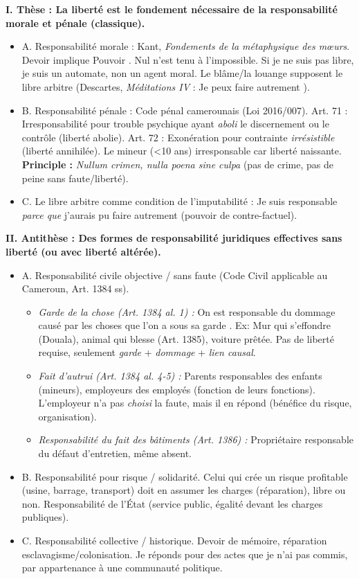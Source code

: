 \documentclass[11pt]{article}
\begin{document}
\begin{exoresolu}
\textbf{I. Thèse : La liberté est le fondement nécessaire de la responsabilité morale et pénale (classique).}
\begin{itemize}
    \item A. Responsabilité morale : Kant, \emph{Fondements de la métaphysique des mœurs}. \og Devoir \fg{} implique \og Pouvoir \fg{}. Nul n'est tenu à l'impossible. Si je ne suis pas libre, je suis un automate, non un agent moral. Le blâme/la louange supposent le libre arbitre (Descartes, \emph{Méditations IV} : \og Je peux faire autrement \fg{}).
    \item B. Responsabilité pénale : Code pénal camerounais (Loi 2016/007). Art. 71 : Irresponsabilité pour trouble psychique ayant \emph{aboli} le discernement ou le contrôle (liberté abolie). Art. 72 : Exonération pour contrainte \emph{irrésistible} (liberté annihilée). Le mineur (<10 ans) irresponsable car liberté naissante. \textbf{Principle :} \emph{Nullum crimen, nulla poena sine culpa} (pas de crime, pas de peine sans faute/liberté).
    \item C. Le libre arbitre comme condition de l'imputabilité : Je suis responsable \emph{parce que} j'aurais pu faire autrement (pouvoir de contre-factuel).
\end{itemize}

\textbf{II. Antithèse : Des formes de responsabilité juridiques effectives sans liberté (ou avec liberté altérée).}
\begin{itemize}
    \item A. Responsabilité civile objective / sans faute (Code Civil applicable au Cameroun, Art. 1384 ss).
        \begin{itemize}
            \item \emph{Garde de la chose (Art. 1384 al. 1) :} \og On est responsable du dommage causé par les choses que l'on a sous sa garde \fg{}. Ex: Mur qui s'effondre (Douala), animal qui blesse (Art. 1385), voiture prêtée. Pas de liberté requise, seulement \emph{garde} + \emph{dommage} + \emph{lien causal}.
            \item \emph{Fait d'autrui (Art. 1384 al. 4-5) :} Parents responsables des enfants (mineurs), employeurs des employés (fonction de leurs fonctions). L'employeur n'a pas \emph{choisi} la faute, mais il en répond (bénéfice du risque, organisation).
            \item \emph{Responsabilité du fait des bâtiments (Art. 1386) :} Propriétaire responsable du défaut d'entretien, même absent.
        \end{itemize}
    \item B. Responsabilité pour risque / solidarité. Celui qui crée un risque profitable (usine, barrage, transport) doit en assumer les charges (réparation), libre ou non. Responsabilité de l'État (service public, égalité devant les charges publiques).
    \item C. Responsabilité collective / historique. Devoir de mémoire, réparation esclavagisme/colonisation. Je réponds pour des actes que je n'ai pas commis, par appartenance à une communauté politique.
\end{itemize}


\end{exoresolu}
\end{document}

